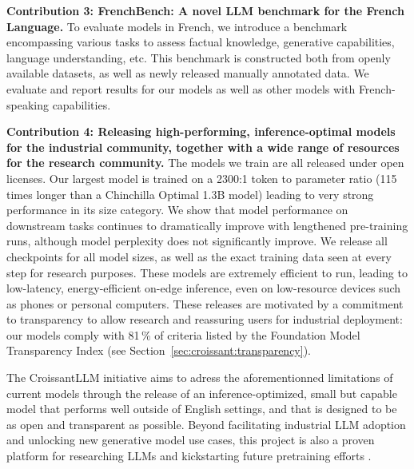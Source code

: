 
\textbf{Contribution 3: FrenchBench: A novel LLM benchmark for the French Language.} To evaluate models in French, we introduce a benchmark encompassing various tasks to assess factual knowledge, generative capabilities, language understanding, etc. This benchmark is constructed both from openly available datasets, as well as newly released manually annotated data. We evaluate and report results for our models as well as other models with French-speaking capabilities.


\textbf{Contribution 4: Releasing high-performing, inference-optimal models for the industrial community, together with a wide range of resources for the research community.}
The models we train are all released under open licenses. Our largest model is trained on a 2300:1 token to parameter ratio (115 times longer than a Chinchilla Optimal 1.3B model) leading to very strong performance in its size category.
We show that model performance on downstream tasks continues to dramatically improve with lengthened pre-training runs, although model perplexity does not significantly improve.
We release all checkpoints for all model sizes, as well as the exact training data seen at every step for research purposes. These models are extremely efficient to run, leading to low-latency, energy-efficient on-edge inference, even on low-resource devices such as phones or personal computers.
These releases are motivated by a commitment to transparency to allow research and reassuring users for industrial deployment: our models comply with 81\,\% of criteria listed by the Foundation Model Transparency Index  (see Section~\ref{sec:croissant:transparency}). 



The CroissantLLM initiative aims to adress the aforementionned limitations of current models through the release of an inference-optimized, small but capable model that performs well outside of English settings, and that is designed to be as open and transparent as possible. Beyond facilitating industrial LLM adoption and unlocking new generative model use cases, this project is also a proven platform for researching LLMs and kickstarting future pretraining efforts 
\cite{martins2024eurollmmultilinguallanguagemodels, meeus2024copyright, shilov2024mosaicmemoryfuzzyduplication, meeus2024sok}.

